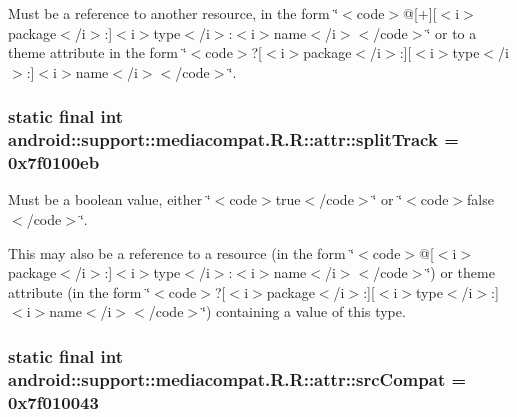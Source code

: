 Must be a reference to another resource, in the form \char`\"{}$<$code$>$@\mbox{[}+\mbox{]}\mbox{[}$<$i$>$package$<$/i$>$:\mbox{]}$<$i$>$type$<$/i$>$:$<$i$>$name$<$/i$>$$<$/code$>$\char`\"{} or to a theme attribute in the form \char`\"{}$<$code$>$?\mbox{[}$<$i$>$package$<$/i$>$:\mbox{]}\mbox{[}$<$i$>$type$<$/i$>$:\mbox{]}$<$i$>$name$<$/i$>$$<$/code$>$\char`\"{}. \hypertarget{classandroid_1_1support_1_1mediacompat_1_1_r_1_1attr_8ad77ded7085aa19f52b1e580daa3f9f}{
\subsubsection[{splitTrack}]{\setlength{\rightskip}{0pt plus 5cm}static final int android::support::mediacompat.R.R::attr::splitTrack = 0x7f0100eb}}
\label{classandroid_1_1support_1_1mediacompat_1_1_r_1_1attr_8ad77ded7085aa19f52b1e580daa3f9f}


Must be a boolean value, either \char`\"{}$<$code$>$true$<$/code$>$\char`\"{} or \char`\"{}$<$code$>$false$<$/code$>$\char`\"{}. 

This may also be a reference to a resource (in the form \char`\"{}$<$code$>$@\mbox{[}$<$i$>$package$<$/i$>$:\mbox{]}$<$i$>$type$<$/i$>$:$<$i$>$name$<$/i$>$$<$/code$>$\char`\"{}) or theme attribute (in the form \char`\"{}$<$code$>$?\mbox{[}$<$i$>$package$<$/i$>$:\mbox{]}\mbox{[}$<$i$>$type$<$/i$>$:\mbox{]}$<$i$>$name$<$/i$>$$<$/code$>$\char`\"{}) containing a value of this type. \hypertarget{classandroid_1_1support_1_1mediacompat_1_1_r_1_1attr_9f91abfbfc94146019ccf5319d05ddde}{
\subsubsection[{srcCompat}]{\setlength{\rightskip}{0pt plus 5cm}static final int android::support::mediacompat.R.R::attr::srcCompat = 0x7f010043}}
\label{classandroid_1_1support_1_1mediacompat_1_1_r_1_1attr_9f91abfbfc94146019ccf5319d05ddde}


